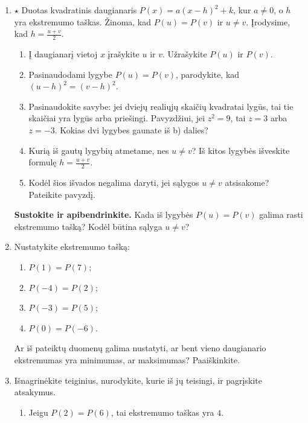\documentclass[12pt,a4paper]{article}
\begin{document}
\begin{enumerate}
\begin{enumerate}
\item Remdamiesi anksčiau nagrinėta simetrija, iškelkite hipotezę: kur turėtų būti daugianario ekstremumo taškas?
\item Jeigu skirtingiems skaičiams $u$ ir $v$ galioja $P(u)=P(v)$, kokia formule galima apskaičiuoti ekstremumo tašką $h$? Paaiškinkite, kodėl brėžinio nepakanka šiai formulei įrodyti.
\end{enumerate}
\textit{Kitame uždavinyje šią hipotezę įrodysime.}
\item\label{vidurio-irodymas} $\star$ Duotas kvadratinis daugianaris $P(x)=a(x-h)^2+k$, kur $a\ne0$, o $h$ yra ekstremumo taškas. Žinoma, kad $P(u)=P(v)$ ir $u\ne v$. Įrodysime, kad $h=\frac{u+v}{2}$.
\begin{enumerate}
\item Į daugianarį vietoj $x$ įrašykite $u$ ir $v$. Užrašykite $P(u)$ ir $P(v)$.
\item Pasinaudodami lygybe $P(u)=P(v)$, parodykite, kad $(u-h)^2=(v-h)^2$.
\item Pasinaudokite savybe: jei dviejų realiųjų skaičių kvadratai lygūs, tai tie skaičiai yra lygūs arba priešingi. Pavyzdžiui, jei $z^2=9$, tai $z=3$ arba $z=-3$. Kokias dvi lygybes gaunate iš b) dalies?
\item Kurią iš gautų lygybių atmetame, nes $u\ne v$? Iš kitos lygybės išveskite formulę $h=\frac{u+v}{2}$.
\item Kodėl šios išvados negalima daryti, jei sąlygos $u\ne v$ atsisakome? Pateikite pavyzdį.
\end{enumerate}
\par\medskip
\textbf{Sustokite ir apibendrinkite.} Kada iš lygybės $P(u)=P(v)$ galima rasti ekstremumo tašką? Kodėl būtina sąlyga $u\ne v$?
\item Nustatykite ekstremumo tašką:
\begin{enumerate}
\item $P(1)=P(7)$; \item $P(-4)=P(2)$; \item $P(-3)=P(5)$; \item $P(0)=P(-6)$.
\end{enumerate}
Ar iš pateiktų duomenų galima nustatyti, ar bent vieno daugianario ekstremumas yra minimumas, ar maksimumas? Paaiškinkite.
\item Išnagrinėkite teiginius, nurodykite, kurie iš jų teisingi, ir pagrįskite atsakymus.
\begin{enumerate}
\item Jeigu $P(2)=P(6)$, tai ekstremumo taškas yra $4$.

\end{enumerate}
\end{enumerate}
\end{document}
